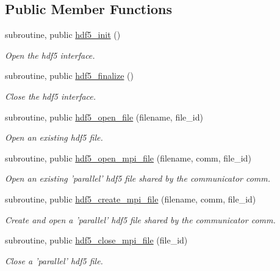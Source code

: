 \subsection*{Public Member Functions}
\begin{DoxyCompactItemize}
\item 
subroutine, public \hyperlink{classmodhdf5_a78ec7a0bfdcd60f1ce1ecf0c88bb7cd9}{hdf5\-\_\-init} ()
\begin{DoxyCompactList}\small\item\em Open the hdf5 interface. \end{DoxyCompactList}\item 
subroutine, public \hyperlink{classmodhdf5_ace643e6a3e592dbe1be4d158888eb477}{hdf5\-\_\-finalize} ()
\begin{DoxyCompactList}\small\item\em Close the hdf5 interface. \end{DoxyCompactList}\item 
subroutine, public \hyperlink{classmodhdf5_a11539d06d180bff29d3c56ba198451d4}{hdf5\-\_\-open\-\_\-file} (filename, file\-\_\-id)
\begin{DoxyCompactList}\small\item\em Open an existing hdf5 file. \end{DoxyCompactList}\item 
subroutine, public \hyperlink{classmodhdf5_a9f6976ee158485f6b203635df23156e3}{hdf5\-\_\-open\-\_\-mpi\-\_\-file} (filename, comm, file\-\_\-id)
\begin{DoxyCompactList}\small\item\em Open an existing 'parallel' hdf5 file shared by the communicator comm. \end{DoxyCompactList}\item 
subroutine, public \hyperlink{classmodhdf5_aba50f37e2c24ac3271cdfc8877ebdcd9}{hdf5\-\_\-create\-\_\-mpi\-\_\-file} (filename, comm, file\-\_\-id)
\begin{DoxyCompactList}\small\item\em Create and open a 'parallel' hdf5 file shared by the communicator comm. \end{DoxyCompactList}\item 
subroutine, public \hyperlink{classmodhdf5_a72cb805582425e8633c70c5db85df8bc}{hdf5\-\_\-close\-\_\-mpi\-\_\-file} (file\-\_\-id)
\begin{DoxyCompactList}\small\item\em Close a 'parallel' hdf5 file. \end{DoxyCompactList}\item 

\end{DoxyCompactItemize}
